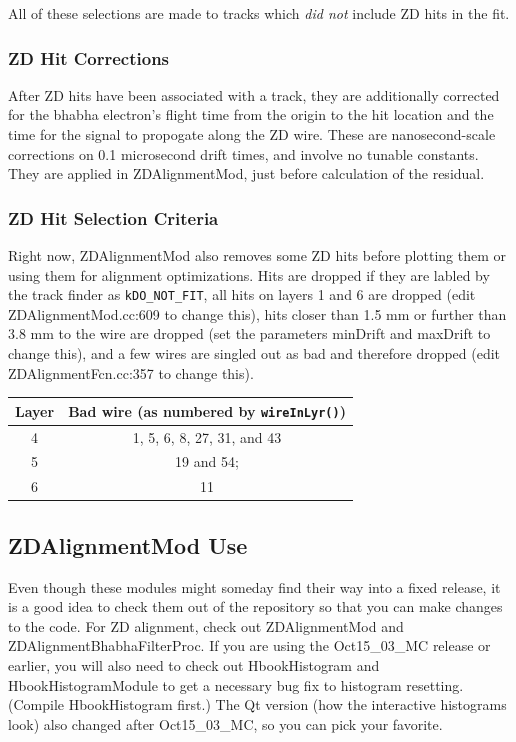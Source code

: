 \documentclass[12pt]{article}
\begin{document}
All of these selections are made to tracks which {\it did not} include
ZD hits in the fit.

\subsubsection{ZD Hit Corrections}

After ZD hits have been associated with a track, they are additionally
corrected for the bhabha electron's flight time from the origin to the
hit location and the time for the signal to propogate along the ZD
wire.  These are nanosecond-scale corrections on 0.1 microsecond drift
times, and involve no tunable constants.  They are applied in
ZDAlignmentMod, just before calculation of the residual.

\subsubsection{ZD Hit Selection Criteria}

Right now, ZDAlignmentMod also removes some ZD hits before plotting
them or using them for alignment optimizations.  Hits are dropped if
they are labled by the track finder as {\tt kDO\_NOT\_FIT}, all hits
on layers 1 and 6 are dropped (edit ZDAlignmentMod.cc:609 to change
this), hits closer than 1.5 mm or further than 3.8 mm to the wire are
dropped (set the parameters minDrift and maxDrift to change this), and
a few wires are singled out as bad and therefore dropped (edit
ZDAlignmentFcn.cc:357 to change this).
\begin{center}
  \begin{tabular}{c | c}
    Layer & \hspace{0.5 cm} Bad wire (as numbered by {\tt wireInLyr()}) \hspace{0.5 cm} \\\hline
    4 & 1, 5, 6, 8, 27, 31, and 43 \\
    5 & 19 and 54; \\
    6 & 11 \\
  \end{tabular}
\end{center}

\subsection{ZDAlignmentMod Use}

Even though these modules might someday find their way into a fixed
release, it is a good idea to check them out of the repository so that
you can make changes to the code.  For ZD alignment, check out
ZDAlignmentMod and ZDAlignmentBhabhaFilterProc.  If you are using the
Oct15\_03\_MC release or earlier, you will also need to check out
HbookHistogram and HbookHistogramModule to get a necessary bug fix to
histogram resetting.  (Compile HbookHistogram first.)  The Qt version
(how the interactive histograms look) also changed after Oct15\_03\_MC,
so you can pick your favorite.
\end{document}
